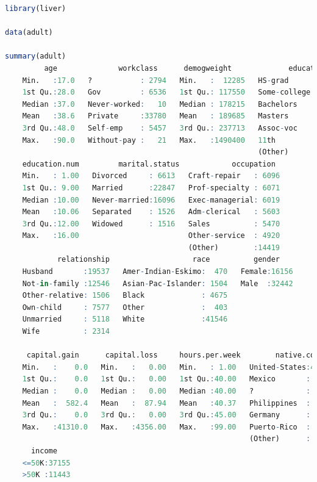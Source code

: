 \documentclass[
]{book}
\theoremstyle{definition}
\theoremstyle{definition}
\theoremstyle{definition}
\theoremstyle{definition}
\theoremstyle{remark}
\begin{document}
\begin{lstlisting}[language=R]
library(liver)

data(adult)

summary(adult)
         age              workclass      demogweight             education    
    Min.   :17.0   ?           : 2794   Min.   :  12285   HS-grad     :15750  
    1st Qu.:28.0   Gov         : 6536   1st Qu.: 117550   Some-college:10860  
    Median :37.0   Never-worked:   10   Median : 178215   Bachelors   : 7962  
    Mean   :38.6   Private     :33780   Mean   : 189685   Masters     : 2627  
    3rd Qu.:48.0   Self-emp    : 5457   3rd Qu.: 237713   Assoc-voc   : 2058  
    Max.   :90.0   Without-pay :   21   Max.   :1490400   11th        : 1812  
                                                          (Other)     : 7529  
    education.num         marital.status            occupation   
    Min.   : 1.00   Divorced     : 6613   Craft-repair   : 6096  
    1st Qu.: 9.00   Married      :22847   Prof-specialty : 6071  
    Median :10.00   Never-married:16096   Exec-managerial: 6019  
    Mean   :10.06   Separated    : 1526   Adm-clerical   : 5603  
    3rd Qu.:12.00   Widowed      : 1516   Sales          : 5470  
    Max.   :16.00                         Other-service  : 4920  
                                          (Other)        :14419  
            relationship                   race          gender     
    Husband       :19537   Amer-Indian-Eskimo:  470   Female:16156  
    Not-in-family :12546   Asian-Pac-Islander: 1504   Male  :32442  
    Other-relative: 1506   Black             : 4675                 
    Own-child     : 7577   Other             :  403                 
    Unmarried     : 5118   White             :41546                 
    Wife          : 2314                                            
                                                                    
     capital.gain      capital.loss     hours.per.week        native.country 
    Min.   :    0.0   Min.   :   0.00   Min.   : 1.00   United-States:43613  
    1st Qu.:    0.0   1st Qu.:   0.00   1st Qu.:40.00   Mexico       :  949  
    Median :    0.0   Median :   0.00   Median :40.00   ?            :  847  
    Mean   :  582.4   Mean   :  87.94   Mean   :40.37   Philippines  :  292  
    3rd Qu.:    0.0   3rd Qu.:   0.00   3rd Qu.:45.00   Germany      :  206  
    Max.   :41310.0   Max.   :4356.00   Max.   :99.00   Puerto-Rico  :  184  
                                                        (Other)      : 2507  
      income     
    <=50K:37155  
    >50K :11443  
                 
                 
                 
                 
   
\end{lstlisting}
\end{document}
